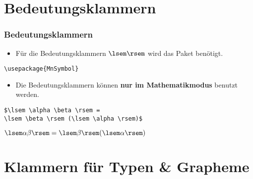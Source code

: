 \section{Bedeutungsklammern}

\begin{frame}[fragile]
\frametitle{Bedeutungsklammern}


\begin{itemize}
	\item Für die Bedeutungsklammern $\lsem \rsem$ wird das Paket  benötigt.
\end{itemize}

\begin{lstlisting}
\usepackage{MnSymbol} 
\end{lstlisting}

\pause 

\begin{itemize}
	\item Die Bedeutungsklammern können \textbf{nur im Mathematikmodus} benutzt werden.
\end{itemize}

\begin{lstlisting}
$\lsem \alpha \beta \rsem = 
\lsem \beta \rsem (\lsem \alpha \rsem)$
\end{lstlisting}

\ea $\lsem \alpha \beta \rsem = \lsem \beta \rsem (\lsem \alpha \rsem)$
\z 

\end{frame}


\section{Klammern für Typen \& Grapheme}

